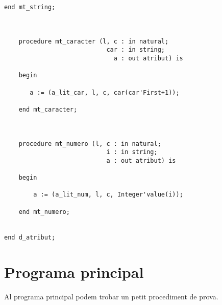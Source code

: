 \documentclass[10pt]{report}
\begin{document}
\begin{lstlisting}[style=Ada]
    end mt_string;
    
    

    procedure mt_caracter (l, c : in natural; 
                            car : in string; 
                              a : out atribut) is
    
    begin
    
       a := (a_lit_car, l, c, car(car'First+1));
       
    end mt_caracter;
        
        
        
    procedure mt_numero (l, c : in natural; 
                            i : in string; 
                            a : out atribut) is
    
    begin
    
        a := (a_lit_num, l, c, Integer'value(i));
        
    end mt_numero;
    

end d_atribut;
    \end{lstlisting}
    \newpage
    
    
    \chapter{Programa principal}
        Al programa principal podem trobar un petit procediment de prova.
    \\
        
\end{document}
